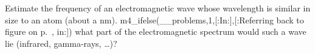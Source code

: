 Estimate the frequency of an electromagnetic wave whose
wavelength is similar in size to an atom (about a nm).
m4_ifelse(__problems,1,[:In:],[:Referring back to figure  on p.~\pageref{fig:em-spectrum}, in:])
what part of the electromagnetic spectrum would such a wave
lie (infrared, gamma-rays, \ldots)?
